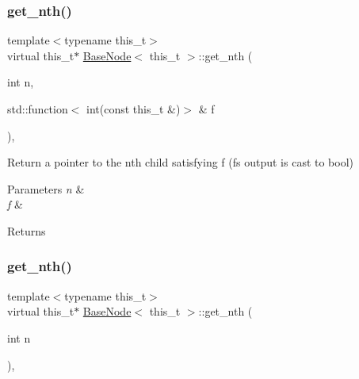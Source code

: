 \mbox{\label{class_base_node_a1e4560f882d4cdb713aea5178a4e2d86}} 
\subsubsection{\texorpdfstring{get\+\_\+nth()}{get\_nth()}\hspace{0.1cm}{\footnotesize\ttfamily [1/2]}}
{\footnotesize\ttfamily template$<$typename this\+\_\+t$>$ \\
virtual this\+\_\+t$\ast$ \hyperlink{class_base_node}{Base\+Node}$<$ this\+\_\+t $>$\+::get\+\_\+nth (\begin{DoxyParamCaption}\item[{int}]{n,  }\item[{std\+::function$<$ int(const this\+\_\+t \&)$>$ \&}]{f }\end{DoxyParamCaption})\hspace{0.3cm}{\ttfamily [inline]}, {\ttfamily [virtual]}}

Return a pointer to the n\textquotesingle{}th child satisfying f (f\textquotesingle{}s output is cast to bool) 
\begin{DoxyParams}{Parameters}
{\em n} & \\
\hline
{\em f} & \\
\hline
\end{DoxyParams}
\begin{DoxyReturn}{Returns}

\end{DoxyReturn}
\mbox{\label{class_base_node_a9381814fdc86029905dc283da5d3d931}} 
\subsubsection{\texorpdfstring{get\+\_\+nth()}{get\_nth()}\hspace{0.1cm}{\footnotesize\ttfamily [2/2]}}
{\footnotesize\ttfamily template$<$typename this\+\_\+t$>$ \\
virtual this\+\_\+t$\ast$ \hyperlink{class_base_node}{Base\+Node}$<$ this\+\_\+t $>$\+::get\+\_\+nth (\begin{DoxyParamCaption}\item[{int}]{n }\end{DoxyParamCaption})\hspace{0.3cm}{\ttfamily [inline]}, {\ttfamily [virtual]}}

